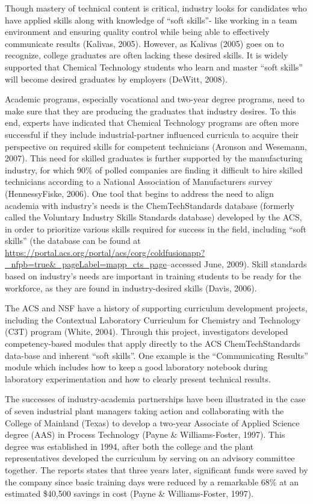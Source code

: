\documentclass[11.5pt]{sig-alternate} %
\begin{document}
\begin{large}
Though mastery of technical content is critical, industry looks for candidates who have applied skills along with knowledge of “soft skills”- like working in a team environment and ensuring quality control while being able to effectively communicate results (Kalivas, 2005). However, as Kalivas (2005) goes on to recognize, college graduates are often lacking these desired skills. It is widely supported that Chemical Technology students who learn and master “soft skills” will become desired graduates by employers (DeWitt, 2008). 

Academic programs, especially vocational and two-year degree programs, need to make sure that they are producing the graduates that industry desires. To this end, experts have indicated that Chemical Technology programs are often more successful if they include industrial-partner influenced curricula to acquire their perspective on required skills for competent technicians (Aronson and Wesemann, 2007). This need for skilled graduates is further supported by the manufacturing industry, for which 90\% of polled companies are finding it difficult to hire skilled technicians according to a National Association of Manufacturers survey (HennessyFiske, 2006). One tool that begins to address the need to align academia with industry’s needs is the ChemTechStandards database (formerly called the Voluntary Industry Skills Standards database) developed by the ACS, in order to prioritize various skills required for success in the field, including “soft skills” (the database can be found at \url{https://portal.acs.org/portal/acs/corg/coldfusionapp?_nfpb=true&_pageLabel=mapp_cts_page}–accessed June, 2009). Skill standards based on industry’s needs are important in training students to be ready for the workforce, as they are found in industry-desired skills (Davis, 2006). 

The ACS and NSF have a history of supporting curriculum development projects, including the Contextual Laboratory Curriculum for Chemistry and Technology (C3T) program (White, 2004). Through this project, investigators developed competency-based modules that apply directly to the ACS ChemTechStandards data-base and inherent “soft skills”. One example is the “Communicating Results” module which includes how to keep a good laboratory notebook during laboratory experimentation and how to clearly present technical results.

The successes of industry-academia partnerships have been illustrated in the case of seven industrial plant managers taking action and collaborating with the College of Mainland (Texas) to develop a two-year Associate of Applied Science degree (AAS) in Process Technology (Payne \& Williams-Foster, 1997). This degree was established in 1994, after both the college and the plant representatives developed the curriculum by serving on an advisory committee together. The reports states that three years later, significant funds were saved by the company since basic training days were reduced by a remarkable 68\% at an estimated \$40,500 savings in cost (Payne \& Williams-Foster, 1997).


\end{large}
\end{document}
